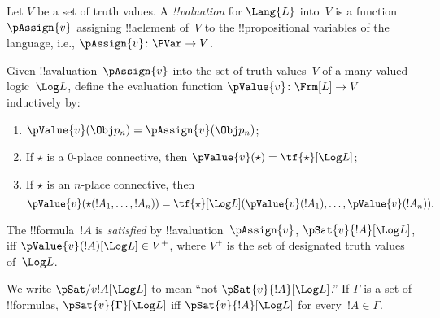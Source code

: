\documentclass[../../../include/open-logic-section]{subfiles}
\begin{document}


\begin{defn}[!!^{valuation}s] 
Let $V$ be a set of truth values. A \emph{!!{valuation}} for
$\Lang{L}$ into~$V$ is a
function~$\pAssign{v}$ assigning !!a{element} of~$V$ to the
!!{propositional variable}s of the language, i.e., $\pAssign{v} \colon
\PVar \to V$.
\end{defn}

\begin{defn}
  Given !!a{valuation}~$\pAssign{v}$ into the set of truth values~$V$ of a
  many-valued logic~$\Log L$, define the evaluation function
  $\pValue{v} \colon \Frm[L] \to V$ inductively by:
  \begin{enumerate}
    \item $\pValue{v}(\Obj p_n) = \pAssign{v}(\Obj p_n)$; 
    \item If $\star$ is a $0$-place connective, then $\pValue{v}(\star)  = \tf{\star}[\Log L]$;
    \item If $\star$ is an $n$-place connective, then 
    \[
      \pValue{v}(\star(!A_1, \dots, !A_n)) = \tf{\star}[\Log L]
      (\pValue{v}(!A_1), \dots, \pValue{v}(!A_n)).
    \]
  \end{enumerate}
\end{defn}

\begin{defn}[Satisfaction]
 The !!{formula}~$!A$ is \emph{satisfied}
  by !!a{valuation}~$\pAssign{v}$, $\pSat{v}{!A}[\Log L]$, iff
  $\pValue{v}(!A)[\Log L] \in V^+$, where $V^+$ is the set of
  designated truth values of~$\Log L$. 
  
  We write $\pSat/{v}{!A}[\Log L]$ to mean ``not $\pSat{v}{!A}[\Log
  L]$.'' If $\Gamma$ is a set of !!{formula}s, $\pSat{v}{\Gamma}[\Log
  L]$ iff $\pSat{v}{!A}[\Log L]$ for every~$!A \in \Gamma$.
\end{defn}
\end{document}
